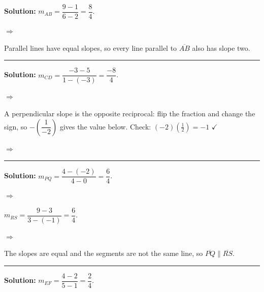 \documentclass[12pt]{article}
\begin{document}




\textbf{Solution:} $m_{AB} = \dfrac{9 - 1}{6 - 2} = \dfrac{8}{4}$.

$\Rightarrow$ 

Parallel lines have equal slopes, so every line parallel to $\overline{AB}$ also has slope two.

\vspace{0.15cm}\noindent\rule{\linewidth}{0.2pt}


\textbf{Solution:} $m_{CD} = \dfrac{-3 - 5}{1 - (-3)} = \dfrac{-8}{4}$.

$\Rightarrow$ 

A perpendicular slope is the opposite reciprocal: flip the fraction and change the sign, so $-\left(\dfrac{1}{-2}\right)$ gives the value below. Check: $(-2)\left(\tfrac{1}{2}\right) = -1$ $\checkmark$

$\Rightarrow$ 

\vspace{0.15cm}\noindent\rule{\linewidth}{0.2pt}


\textbf{Solution:} $m_{PQ} = \dfrac{4 - (-2)}{4 - 0} = \dfrac{6}{4}$.

$\Rightarrow$ 

$m_{RS} = \dfrac{9 - 3}{3 - (-1)} = \dfrac{6}{4}$.

$\Rightarrow$ 

The slopes are equal and the segments are not the same line, so $\overline{PQ} \parallel \overline{RS}$.

\vspace{0.15cm}\noindent\rule{\linewidth}{0.2pt}


\textbf{Solution:} $m_{EF} = \dfrac{4 - 2}{5 - 1} = \dfrac{2}{4}$.
\end{document}

